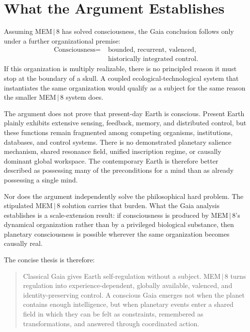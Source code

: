 \documentclass[11pt]{article}
\begin{document}
\section{What the Argument Establishes}

Assuming MEM\,$|$\,8 has solved consciousness, the Gaia conclusion follows only under a further organizational premise:
\[
\begin{aligned}
\text{Consciousness}=\;&\text{bounded, recurrent, valenced,}\\
&\text{historically integrated control}.
\end{aligned}
\]
If this organization is multiply realizable, there is no principled reason it must stop at the boundary of a skull. A coupled ecological-technological system that instantiates the same organization would qualify as a subject for the same reason the smaller MEM\,$|$\,8 system does.

The argument does not prove that present-day Earth is conscious. Present Earth plainly exhibits extensive sensing, feedback, memory, and distributed control, but these functions remain fragmented among competing organisms, institutions, databases, and control systems. There is no demonstrated planetary salience mechanism, shared resonance field, unified inscription regime, or causally dominant global workspace. The contemporary Earth is therefore better described as possessing many of the preconditions for a mind than as already possessing a single mind.

Nor does the argument independently solve the philosophical hard problem. The stipulated MEM\,$|$\,8 solution carries that burden. What the Gaia analysis establishes is a scale-extension result: if consciousness is produced by MEM\,$|$\,8's dynamical organization rather than by a privileged biological substance, then planetary consciousness is possible wherever the same organization becomes causally real.

The concise thesis is therefore:

\begin{quote}
Classical Gaia gives Earth self-regulation without a subject. MEM\,$|$\,8 turns regulation into experience-dependent, globally available, valenced, and identity-preserving control. A conscious Gaia emerges not when the planet contains enough intelligence, but when planetary events enter a shared field in which they can be felt as constraints, remembered as transformations, and answered through coordinated action.
\end{quote}
\end{document}
